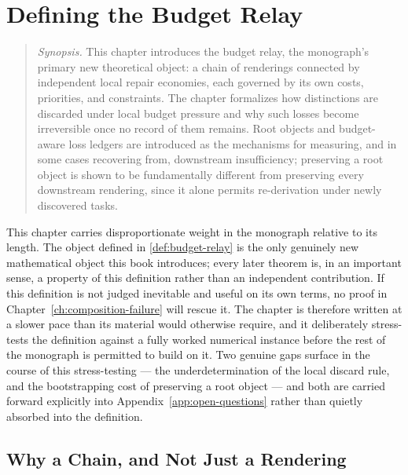 \chapter{Defining the Budget Relay}
\label{ch:budget-relay}

\begin{quotation}
\noindent\textit{Synopsis.} This chapter introduces the budget relay, the
monograph's primary new theoretical object: a chain of renderings connected
by independent local repair economies, each governed by its own costs,
priorities, and constraints. The chapter formalizes how distinctions are
discarded under local budget pressure and why such losses become
irreversible once no record of them remains. Root objects and
budget-aware loss ledgers are introduced as the mechanisms for measuring,
and in some cases recovering from, downstream insufficiency; preserving a
root object is shown to be fundamentally different from preserving every
downstream rendering, since it alone permits re-derivation under newly
discovered tasks.
\end{quotation}

This chapter carries disproportionate weight in the monograph relative to
its length. The object defined in \cref{def:budget-relay} is the only
genuinely new mathematical object this book introduces; every later
theorem is, in an important sense, a property of this definition rather
than an independent contribution. If this definition is not judged
inevitable and useful on its own terms, no proof in
Chapter~\ref{ch:composition-failure} will rescue it. The chapter is
therefore written at a slower pace than its material would otherwise
require, and it deliberately stress-tests the definition against a fully
worked numerical instance before the rest of the monograph is permitted to
build on it. Two genuine gaps surface in the course of this stress-testing
--- the underdetermination of the local discard rule, and the bootstrapping
cost of preserving a root object --- and both are carried forward
explicitly into Appendix~\ref{app:open-questions} rather than quietly
absorbed into the definition.

\section{Why a Chain, and Not Just a Rendering}

